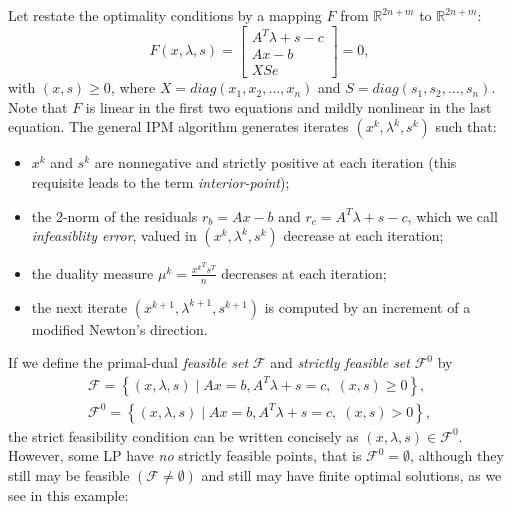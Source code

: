 \documentclass[a4paper,10 pt,titlepage,twoside]{book}
\theoremstyle{plain}
\theoremstyle{definition}
\theoremstyle{remark}
\begin{document}
 Let restate the optimality conditions by a mapping $\mathit{F}$ from $\mathbb{R}^{2n+m}$ to $\mathbb{R}^{2n+m}$:
\begin{equation}\label{F}
	\mathit{F}(x,\lambda,s)= \begin{bmatrix}
	A^{T}\lambda+s-c \\Ax-b \\XSe
	\end{bmatrix}=0,
\end{equation}
with $(x,s)\geq0$, where $X = diag(x_{1}, x_{2},...,x_{n})$ and $S = diag(s_{1}, s_{2},...,s_{n})$.\\
Note that $\mathit{F}$ is linear in the first two equations and mildly nonlinear in the last equation. 
The general IPM algorithm generates iterates $(x^{k},\lambda^{k},s^{k})$ such that:
\begin{itemize}
	\item $x^{k}$ and $s^{k}$ are nonnegative and strictly positive at each iteration (this requisite leads to the term \textit{interior-point});
	\item the 2-norm of the residuals $r_{b} = Ax - b$ and $r_{c} =A^{T}\lambda +s - c$, which we call \textit{infeasiblity error}, valued in $(x^{k},\lambda^{k},s^{k})$ decrease at each iteration;
	\item the duality measure $\mu^{k} = \frac{{x^{k}}^{T}s^{T}}{n}$ decreases at each iteration;
	\item the next iterate $(x^{k+1},\lambda^{k+1},s^{k+1})$ is computed by an increment of a modified Newton's direction.
\end{itemize}
If we define the primal-dual \textit{feasible set} $\mathcal{F}$ and \textit{strictly feasible set} $\mathcal{F}^{0}$ by
\begin{align*}
\mathcal{F} = \left\lbrace(x,\lambda,s)\;|\;Ax = b, A^{T}\lambda+s =c,\;(x,s)\geq0\right\rbrace, \\
\mathcal{F}^{0} = \left\lbrace(x,\lambda,s)\;|\;Ax = b, A^{T}\lambda+s =c,\;(x,s)>0\right\rbrace, 
\end{align*}
the strict feasibility condition can be written concisely as $(x,\lambda,s)\in\mathcal{F}^{0}$.\\
However, some LP have \textit{no} strictly feasible points, that is $\mathcal{F}^{0}=\emptyset$, although they still may be feasible $(\mathcal{F} \neq \emptyset)$ and still may have finite optimal solutions, as we see in this example:
\end{document}
